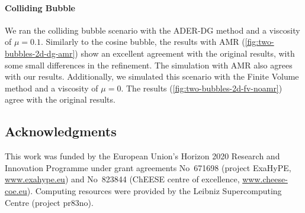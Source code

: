\documentclass[runningheads]{llncs}
\begin{document}
\paragraph{Colliding Bubble}
We ran the colliding bubble scenario with the ADER-DG method and a viscosity of $\mu=0.1$.
Similarly to the cosine bubble, the results with AMR (\cref{fig:two-bubbles-2d-dg-amr}) show an excellent agreement with the original results, with some small differences in the refinement.
The simulation with AMR also agrees with our results.
Additionally, we simulated this scenario with the Finite Volume method and a viscosity of $\mu=0$.
The results (\cref{fig:two-bubbles-2d-fv-noamr}) agree with the original results.

\subsection*{Acknowledgments}
This work was funded by the European Union’s Horizon 2020 Research and Innovation Programme under grant agreements 
No~671698 (project ExaHyPE, \url{www.exahype.eu}) and 
No~823844 (ChEESE centre of excellence, \url{www.cheese-coe.eu}).
Computing resources were provided by the Leibniz Supercomputing Centre (project pr83no).


{}
\end{document}
